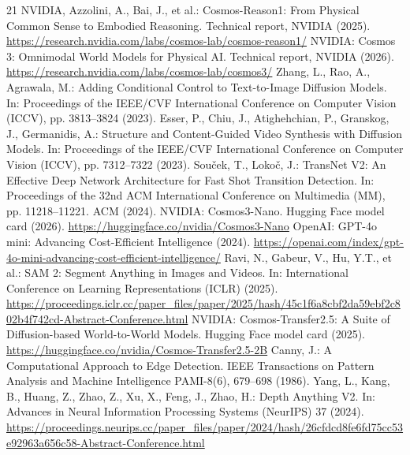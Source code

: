 \documentclass[runningheads]{llncs}
\begin{document}
\begin{thebibliography}{21}
 NVIDIA, Azzolini, A., Bai, J., et al.: Cosmos-Reason1: From Physical Common Sense to Embodied Reasoning. Technical report, NVIDIA (2025). \url{https://research.nvidia.com/labs/cosmos-lab/cosmos-reason1/}
 NVIDIA: Cosmos 3: Omnimodal World Models for Physical AI. Technical report, NVIDIA (2026). \url{https://research.nvidia.com/labs/cosmos-lab/cosmos3/}
 Zhang, L., Rao, A., Agrawala, M.: Adding Conditional Control to Text-to-Image Diffusion Models. In: Proceedings of the IEEE/CVF International Conference on Computer Vision (ICCV), pp. 3813--3824 (2023). 
 Esser, P., Chiu, J., Atighehchian, P., Granskog, J., Germanidis, A.: Structure and Content-Guided Video Synthesis with Diffusion Models. In: Proceedings of the IEEE/CVF International Conference on Computer Vision (ICCV), pp. 7312--7322 (2023). 
 Sou\v{c}ek, T., Loko\v{c}, J.: TransNet V2: An Effective Deep Network Architecture for Fast Shot Transition Detection. In: Proceedings of the 32nd ACM International Conference on Multimedia (MM), pp. 11218--11221. ACM (2024). 
 NVIDIA: Cosmos3-Nano. Hugging Face model card (2026). \url{https://huggingface.co/nvidia/Cosmos3-Nano}
 OpenAI: GPT-4o mini: Advancing Cost-Efficient Intelligence (2024). \url{https://openai.com/index/gpt-4o-mini-advancing-cost-efficient-intelligence/}
 Ravi, N., Gabeur, V., Hu, Y.T., et al.: SAM 2: Segment Anything in Images and Videos. In: International Conference on Learning Representations (ICLR) (2025). \url{https://proceedings.iclr.cc/paper_files/paper/2025/hash/45c1f6a8cbf2da59ebf2c802b4f742cd-Abstract-Conference.html}
 NVIDIA: Cosmos-Transfer2.5: A Suite of Diffusion-based World-to-World Models. Hugging Face model card (2025). \url{https://huggingface.co/nvidia/Cosmos-Transfer2.5-2B}
 Canny, J.: A Computational Approach to Edge Detection. IEEE Transactions on Pattern Analysis and Machine Intelligence PAMI-8(6), 679--698 (1986). 
 Yang, L., Kang, B., Huang, Z., Zhao, Z., Xu, X., Feng, J., Zhao, H.: Depth Anything V2. In: Advances in Neural Information Processing Systems (NeurIPS) 37 (2024). \url{https://proceedings.neurips.cc/paper_files/paper/2024/hash/26cfdcd8fe6fd75cc53e92963a656c58-Abstract-Conference.html}
\end{thebibliography}
\end{document}
